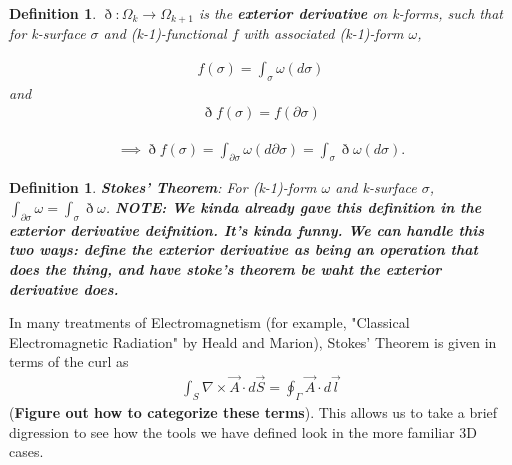 \documentclass{book}
\newtheorem{defn}[equation]{Definition}
\begin{document}
\begin{defn}
	$\eth : \Omega_k \to \Omega_{k+1}$ is the \textbf{exterior derivative} on k-forms, such that for k-surface $\sigma$ and (k-1)-functional $f$ with associated (k-1)-form $\omega$, 
	
	\begin{gather}f(\sigma) = \int_{\sigma}\omega(d\sigma)\end{gather} and \begin{gather} \eth f(\sigma) = f(\partial\sigma) \end{gather}
	
	\begin{gather}\implies \eth f(\sigma) = \int_{\partial\sigma} \omega(d\partial\sigma) = \int_{\sigma} \eth\omega(d\sigma).\end{gather} 
\end{defn}




 
 
 
 
 
 






\begin{defn}
	\textbf{Stokes' Theorem}: For (k-1)-form $\omega$ and k-surface $\sigma$, $\int_{\partial \sigma}\omega = \int_{\sigma}\eth\omega$. \textbf{NOTE: We kinda already gave this definition in the exterior derivative deifnition. It's kinda funny. We can handle this two ways: define the exterior derivative as being an operation that does the thing, and have stoke's theorem be waht the exterior derivative does. }
\end{defn}

In many treatments of Electromagnetism (for example, "Classical Electromagnetic Radiation" by Heald and Marion), Stokes' Theorem is given in terms of the curl as \begin{gather}\int_S \nabla \times \vec{A} \cdot d\vec{S} = \oint_{\Gamma} \vec{A} \cdot d\vec{l}\end{gather} (\textbf{Figure out how to categorize these terms}). This allows us to take a brief digression to see how the tools we have defined look in the more familiar 3D cases. 
\end{document}
